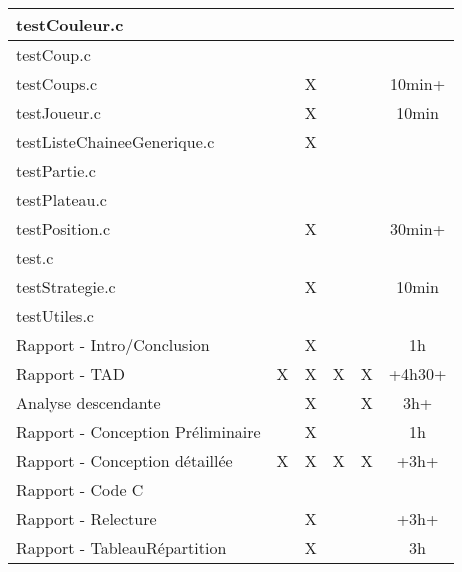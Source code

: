 \begin{table}[h]
\begin{tabular}{l|c|c|c|c|c|}
\multicolumn{1}{|l|}{testCouleur.c}&  &    &  &   &  \\ \hline
\multicolumn{1}{|l|}{testCoup.c}&  &   &  &   &  \\ \hline
\multicolumn{1}{|l|}{testCoups.c}&  & X  &  &   & 10min+ \\ \hline
\multicolumn{1}{|l|}{testJoueur.c}&  & X &  &   & 10min \\ \hline
\multicolumn{1}{|l|}{testListeChaineeGenerique.c}&  &  X &  &   &  \\ \hline
\multicolumn{1}{|l|}{testPartie.c}&  &   &  &   &  \\ \hline
\multicolumn{1}{|l|}{testPlateau.c}&  &   &  &   &  \\ \hline
\multicolumn{1}{|l|}{testPosition.c}&  & X  &  &   &  30min+ \\ \hline
\multicolumn{1}{|l|}{test.c}&  &   &  &   &  \\ \hline
\multicolumn{1}{|l|}{testStrategie.c}&  & X  &  &   & 10min \\ \hline
\multicolumn{1}{|l|}{testUtiles.c}&  &   &  &   &  \\ \hline
\multicolumn{1}{|l|}{Rapport - Intro/Conclusion} &  & X  &  & & 1h    \\ \hline
\multicolumn{1}{|l|}{Rapport - TAD}& X & X  & X  &   X & +4h30+   \\ \hline
\multicolumn{1}{|l|}{Analyse descendante}&      & X    &    & X    & 3h+    \\ \hline
\multicolumn{1}{|l|}{Rapport - Conception Préliminaire} &   & X   &  &      &   1h    \\ \hline
\multicolumn{1}{|l|}{Rapport - Conception détaillée}& X  & X  &X   & X    &  +3h+  \\ \hline
\multicolumn{1}{|l|}{Rapport - Code C}&     &     &       &     &     \\ \hline
\multicolumn{1}{|l|}{Rapport - Relecture} &    & X    &      &     &    +3h+  \\ \hline
\multicolumn{1}{|l|}{Rapport - TableauRépartition} &    & X    &      &     &    3h  \\ \hline
\end{tabular}
\end{table}
